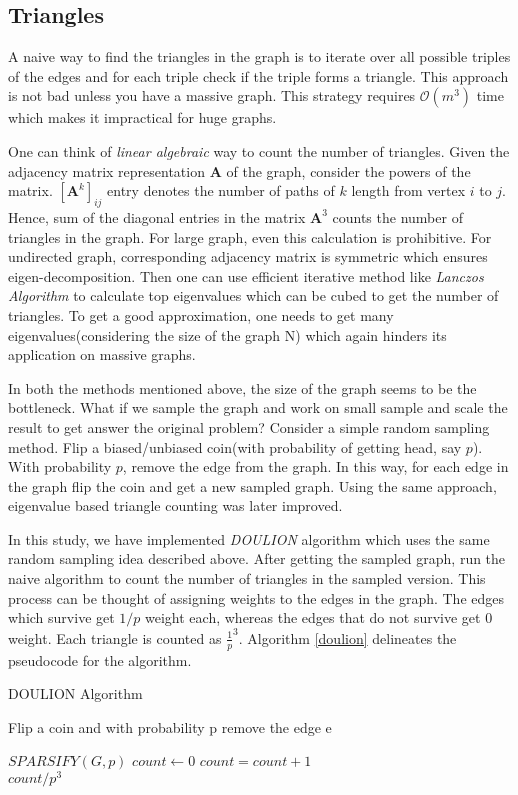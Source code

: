 \documentclass[12pt]{article}
\begin{document}
\subsection{Triangles}
A naive way to find the triangles in the graph is to iterate over all possible triples of the edges and for each triple check if the triple forms a triangle. This approach is not bad unless you have a massive graph. This strategy requires $\mathcal{O}(m^3)$ time which makes it impractical for huge graphs.
\par One can think of {\it linear algebraic} way to count the number of triangles. Given the adjacency matrix representation $\mathbf{A}$ of the graph, consider the powers of the matrix. $[\mathbf{A}^k]_{ij}$ entry denotes the number of paths of $k$ length from vertex $i$ to $j$. Hence, sum of the diagonal entries in the matrix $\mathbf{A}^3$ counts the number of triangles in the graph. For large graph, even this calculation is prohibitive. For undirected graph, corresponding adjacency matrix is symmetric which ensures eigen-decomposition. Then one can use efficient iterative method like {\it Lanczos Algorithm} to calculate top eigenvalues which can be cubed to get the number of triangles\cite{eigen}. To get a good approximation, one needs to get many eigenvalues(considering the size of the graph N) which again hinders its application on massive graphs.
\par In both the methods mentioned above, the size of the graph seems to be the bottleneck. What if we sample the graph and work on small sample and scale the result to get answer the original problem? Consider a simple random sampling method. Flip a biased/unbiased coin(with probability of getting head, say $p$). With probability $p$, remove the edge from the graph. In this way, for each edge in the graph flip the coin and get a new sampled graph. Using the same approach, eigenvalue based triangle counting was later improved\cite{improved_eigen}.
\par In this study, we have implemented {\it DOULION}\cite{doulion} algorithm which uses the same random sampling idea described above. After getting the sampled graph, run the naive algorithm to count the number of triangles in the sampled version. This process can be thought of assigning weights to the edges in the graph. The edges which survive get $1 / p$ weight each, whereas the edges that do not survive get $0$ weight. Each triangle is counted as ${\frac {1}{p}}^3$. Algorithm \ref{doulion} delineates the pseudocode for the algorithm.
\begin{algorithm}[H]
\caption{DOULION Algorithm}\label{doulion}
\begin{algorithmic}
\State Flip a coin and with probability p remove the edge e
\EndFor
\EndProcedure

\State $SPARSIFY(G, p)$
\State $count \gets 0$
\State $count = count + 1$
\EndIf
\EndFor \\
\Return $count / p^3$
\EndProcedure
\end{algorithmic}
\end{algorithm}
\end{document}
